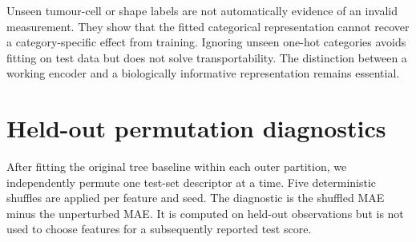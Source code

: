 \documentclass[11pt]{article}
\begin{document}
Unseen tumour-cell or shape labels are not automatically evidence of an invalid measurement. They show that the fitted categorical representation cannot recover a category-specific effect from training. Ignoring unseen one-hot categories avoids fitting on test data but does not solve transportability. The distinction between a working encoder and a biologically informative representation remains essential.

\section{Held-out permutation diagnostics}
After fitting the original tree baseline within each outer partition, we independently permute one test-set descriptor at a time. Five deterministic shuffles are applied per feature and seed. The diagnostic is the shuffled MAE minus the unperturbed MAE. It is computed on held-out observations but is not used to choose features for a subsequently reported test score.
\end{document}
